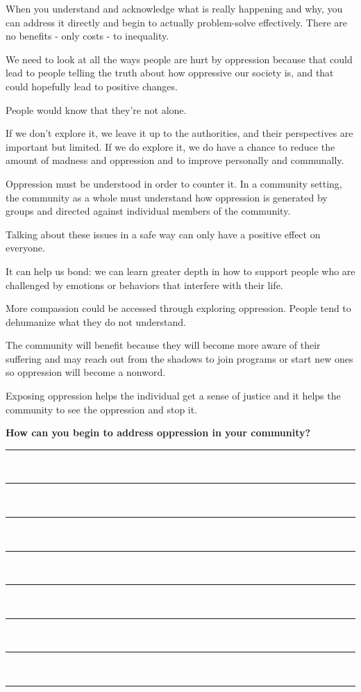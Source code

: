 \begin{checkboxlist}
	\item When you understand and acknowledge what is really happening and why, you can address it directly and begin to actually problem-solve effectively. There are no benefits - only costs - to inequality.
	\item We need to look at all the ways people are hurt by oppression because that could lead to people telling the truth about how oppressive our society is, and that could hopefully lead to positive changes.
	\item People would know that they’re not alone.
	\item If we don’t explore it, we leave it up to the authorities, and their perspectives are important but limited. If we do explore it, we do have a chance to reduce the amount of madness and oppression and to improve personally and communally.	
	\item Oppression must be understood in order to counter it. In a community setting, the community as a whole must understand how oppression is generated by groups and directed against individual members of the community.
	\item Talking about these issues in a safe way can only have a positive effect on everyone.
	\item It can help us bond: we can learn greater depth in how to support people who are challenged by emotions or behaviors that interfere with their life.
	\item More compassion could be accessed through exploring oppression. People tend to dehumanize what they do not understand.
	\item The community will benefit because they will become more aware of their suffering and may reach out from the shadows to join programs or start new ones so oppression will become a nonword.
	\item Exposing oppression helps the individual get a sense of justice and it helps the community to see the oppression and stop it.
\end{checkboxlist}

\noindent\textcolor{ProcessBlue}{\textbf{\LARGE{How can you begin to address oppression in your community?}}}\\

\noindent\rule{\textwidth}{1pt}\\
\noindent\rule{\textwidth}{1pt}\\
\noindent\rule{\textwidth}{1pt}\\
\noindent\rule{\textwidth}{1pt}\\
\noindent\rule{\textwidth}{1pt}\\
\noindent\rule{\textwidth}{1pt}\\
\noindent\rule{\textwidth}{1pt}\\
\noindent\rule{\textwidth}{1pt}\\\\



